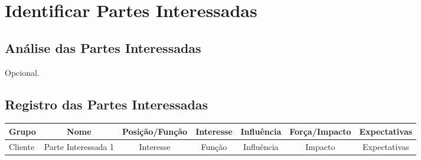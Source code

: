 \section{Identificar Partes Interessadas}

\subsection{Análise das Partes Interessadas}

Opcional.

\subsection{Registro das Partes Interessadas}

\begin{tabular}{l*{6}{c}}
	Grupo & Nome & Posição/Função & Interesse & Influência & Força/Impacto & Expectativas \\
	\hline
	Cliente & Parte Interessada 1 & Interesse & Função & Influência & Impacto & Expectativas \\
\end{tabular}

